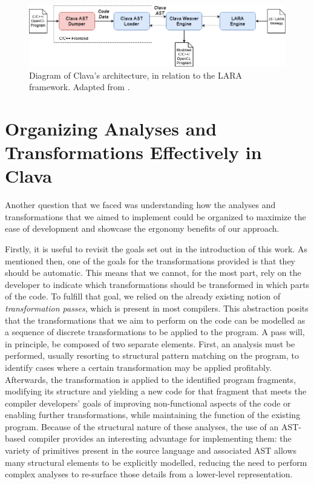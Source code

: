 \begin{figure}
    \centering
    \includegraphics[width=\textwidth]{figures/clava_arch.png}
    \caption{Diagram of Clava's architecture, in relation to the LARA framework. Adapted from \cite{Bispo2020}.}
    \label{fig:clava_arch}
\end{figure}

\section{Organizing Analyses and Transformations Effectively in Clava}

Another question that we faced was understanding how the analyses and transformations that we aimed to implement could be organized to maximize the ease of development and showcase the ergonomy benefits of our approach.

Firstly, it is useful to revisit the goals set out in the introduction of this work. As mentioned then, one of the goals for the transformations provided is that they should be automatic. This means that we cannot, for the most part, rely on the developer to indicate which transformations should be transformed in which parts of the code. To fulfill that goal, we relied on the already existing notion of \textit{transformation passes}, which is present in most compilers. This abstraction posits that the transformations that we aim to perform on the code can be modelled as a sequence of discrete transformations to be applied to the program. A pass will, in principle, be composed of two separate elements. First, an analysis must be performed, usually resorting to structural pattern matching on the program, to identify cases where a certain transformation may be applied profitably. Afterwards, the transformation is applied to the identified program fragments, modifying its structure and yielding a new code for that fragment that meets the compiler developers' goals of improving non-functional aspects of the code or enabling further transformations, while maintaining the function of the existing program. Because of the structural nature of these analyses, the use of an AST-based compiler provides an interesting advantage for implementing them: the variety of primitives present in the source language and associated AST allows many structural elements to be explicitly modelled, reducing the need to perform complex analyses to re-surface those details from a lower-level representation.

